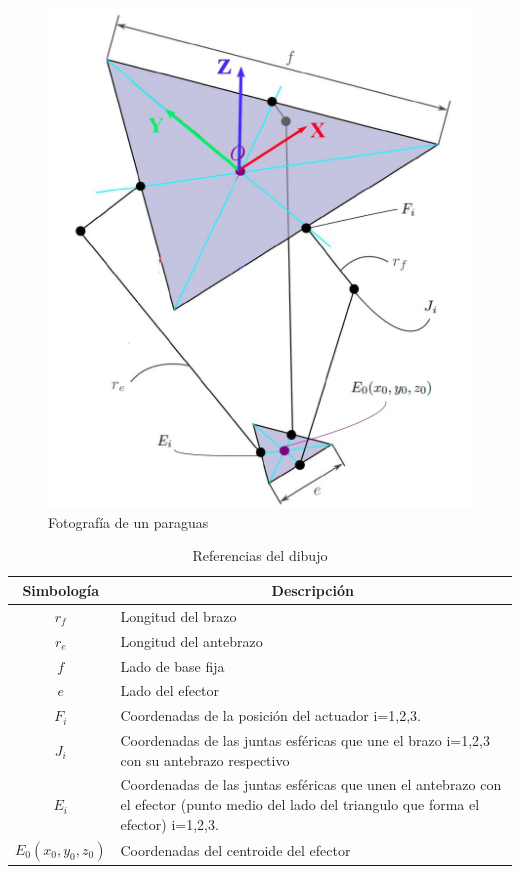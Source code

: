         \begin{figure}[htb]
             \centering
             \includegraphics[width=0.45\linewidth]{Main/Chapter4/Images4/DIBUJO3.jpg}
              \caption{Fotografía de un paraguas}
              \label{f:Cap4_Metodo_A_Modelacion_Cinematica_Posicion_2}
        \end{figure}
        

        \begingroup
            \renewcommand{\arraystretch}{1.5}
            \begin{table}[H]
            \centering
            \begin{tabular}{c m{12cm}}
               \hline
               \textbf{Simbología}  & \multicolumn{1}{c|}{\textbf{Descripción}}  \\\hline\hline
                $r_{f}$  & Longitud del brazo                                    \\\hline
               $r_{e}$  & Longitud del antebrazo                                \\\hline               
               $f$  & Lado de base fija                                         \\\hline
               $e$  & Lado del efector                                          \\\hline
               $F_{i}$  & Coordenadas de la posición del actuador i=1,2,3.    \\\hline
               $J_{i}$  & Coordenadas de las juntas esféricas que une el brazo i=1,2,3 con su antebrazo respectivo   \\\hline
               $E_{i}$  & Coordenadas de las juntas esféricas que unen el antebrazo con el efector (punto medio del lado
               del triangulo que forma el efector) i=1,2,3.    \\\hline
               $E_{0}(x_{0},y_{0},z_{0})$  & Coordenadas del centroide del efector   \\\hline               
            \end{tabular}
            \caption{Referencias del dibujo}
            \label{tab:cap4_tabla_2}
        \end{table}
        \endgroup
        
